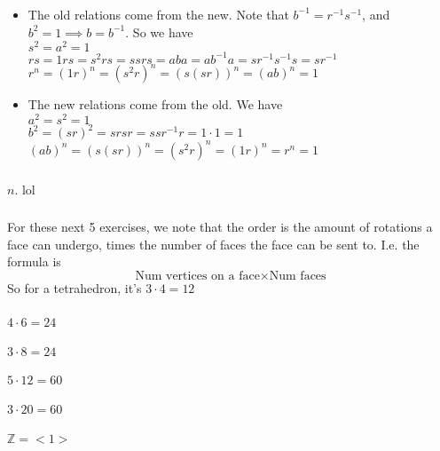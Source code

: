 \documentclass{article}
\newcommand{\ints}{\mathbb{Z}}
\newcommand{\inv}[1]{ {#1}^{-1} }
\begin{document}
\subsubsection{}\label{ex2p7}
\begin{itemize}
\item The old relations come from the new. Note that $\inv{b} = \inv{r}\inv{s}$, and $b^2 = 1 \implies b = \inv{b}$. So we have\\
$s^2 = a^2 = 1$\\
$rs = 1rs = s^2rs = ssrs = aba = a\inv{b}a = s\inv{r}\inv{s} s = s\inv{r}$\\
$r^n = (1r)^n = (s^2r)^n = (s(sr))^n = (ab)^n = 1$
\item The new relations come from the old. We have\\
$a^2 = s^2 = 1$\\
$b^2 = (sr)^2 = srsr = ss\inv{r}r = 1\cdot 1 = 1$\\
$(ab)^n =(s(sr))^n = (s^2r)^n = (1r)^n = r^n = 1$
\end{itemize}
\subsubsection{}
$n$. lol
\subsubsection{}
For these next 5 exercises, we note that the order is the amount of rotations a face can undergo, times the number of faces the face can be sent to. I.e. the formula is
\begin{equation*}
\mbox{Num vertices on a face} \times \mbox{Num faces}
\end{equation*}
So for a tetrahedron, it's $3\cdot 4=12$
\subsubsection{}
$4\cdot6 = 24$
\subsubsection{}
$3\cdot 8 = 24$
\subsubsection{}
$5\cdot 12 = 60$
\subsubsection{}
$3\cdot 20 = 60$
\subsubsection{}
$\ints = <1>$
\end{document}
